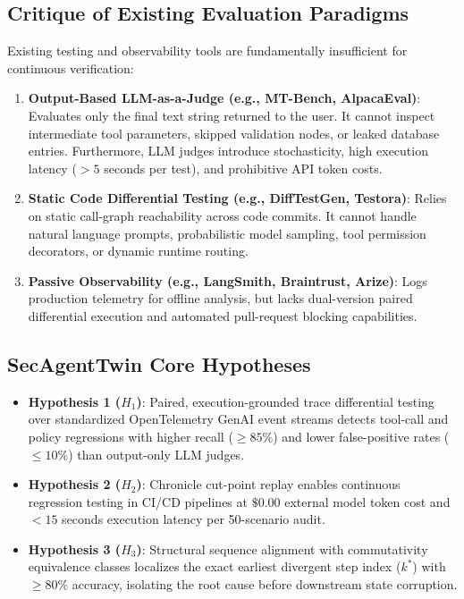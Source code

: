 \documentclass[11pt,a4paper]{article}
\begin{document}
\subsection{Critique of Existing Evaluation Paradigms}
Existing testing and observability tools are fundamentally insufficient for continuous verification:
\begin{enumerate}[leftmargin=1.5em,noitemsep]
    \item \textbf{Output-Based LLM-as-a-Judge (e.g., MT-Bench, AlpacaEval)}: Evaluates only the final text string returned to the user. It cannot inspect intermediate tool parameters, skipped validation nodes, or leaked database entries. Furthermore, LLM judges introduce stochasticity, high execution latency ($>5$ seconds per test), and prohibitive API token costs.
    \item \textbf{Static Code Differential Testing (e.g., DiffTestGen, Testora)}: Relies on static call-graph reachability across code commits. It cannot handle natural language prompts, probabilistic model sampling, tool permission decorators, or dynamic runtime routing.
    \item \textbf{Passive Observability (e.g., LangSmith, Braintrust, Arize)}: Logs production telemetry for offline analysis, but lacks dual-version paired differential execution and automated pull-request blocking capabilities.
\end{enumerate}

\subsection{SecAgentTwin Core Hypotheses}
\begin{itemize}[leftmargin=1.5em,noitemsep]
    \item \textbf{Hypothesis 1 ($H_1$)}: Paired, execution-grounded trace differential testing over standardized OpenTelemetry GenAI event streams detects tool-call and policy regressions with higher recall ($\ge 85\%$) and lower false-positive rates ($\le 10\%$) than output-only LLM judges.
    \item \textbf{Hypothesis 2 ($H_2$)}: Chronicle cut-point replay enables continuous regression testing in CI/CD pipelines at $\$0.00$ external model token cost and $<15$ seconds execution latency per 50-scenario audit.
    \item \textbf{Hypothesis 3 ($H_3$)}: Structural sequence alignment with commutativity equivalence classes localizes the exact earliest divergent step index ($k^*$) with $\ge 80\%$ accuracy, isolating the root cause before downstream state corruption.
\end{itemize}
\end{document}

